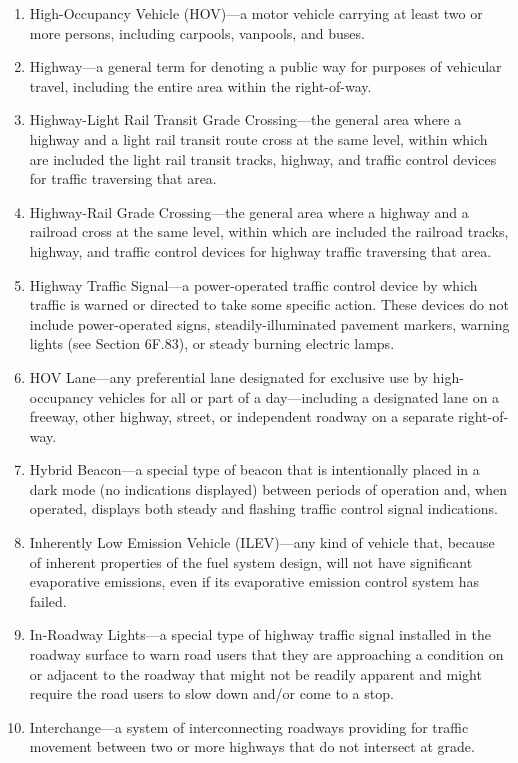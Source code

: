 \documentclass[9pt]{memoir}
\begin{document}
{\begin{enumerate}[label=\arabic*., ref=\arabic*]
\item High-Occupancy Vehicle (HOV)---a motor vehicle carrying at least two or more persons, including carpools, vanpools, and buses.
\item Highway---a general term for denoting a public way for purposes of vehicular travel, including the entire area within the right-of-way.
\item Highway-Light Rail Transit Grade Crossing---the general area where a highway and a light rail transit route cross at the same level, within which are included the light rail transit tracks, highway, and traffic control devices for traffic traversing that area.
\item Highway-Rail Grade Crossing---the general area where a highway and a railroad cross at the same level, within which are included the railroad tracks, highway, and traffic control devices for highway traffic traversing that area.
\item Highway Traffic Signal---a power-operated traffic control device by which traffic is warned or directed to take some specific action. These devices do not include power-operated signs, steadily-illuminated pavement markers, warning lights (see Section 6F.83), or steady burning electric lamps.
\item HOV Lane---any preferential lane designated for exclusive use by high-occupancy vehicles for all or part of a day---including a designated lane on a freeway, other highway, street, or independent roadway on a separate right-of-way.
\item Hybrid Beacon---a special type of beacon that is intentionally placed in a dark mode (no indications displayed) between periods of operation and, when operated, displays both steady and flashing traffic control signal indications.
\item Inherently Low Emission Vehicle (ILEV)---any kind of vehicle that, because of inherent properties of the fuel system design, will not have significant evaporative emissions, even if its evaporative emission control system has failed.
\item In-Roadway Lights---a special type of highway traffic signal installed in the roadway surface to warn road users that they are approaching a condition on or adjacent to the roadway that might not be readily apparent and might require the road users to slow down and/or come to a stop.
\item Interchange---a system of interconnecting roadways providing for traffic movement between two or more highways that do not intersect at grade.

\end{enumerate}}
\end{document}
